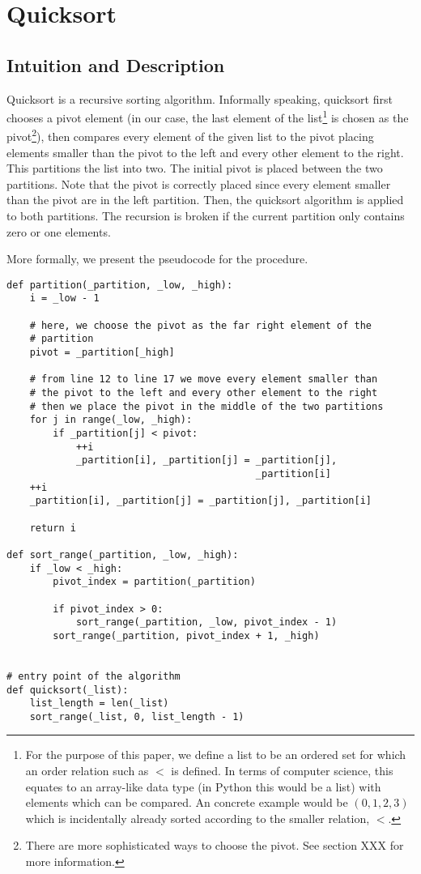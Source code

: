 \section{Quicksort}
\subsection{Intuition and Description}
Quicksort is a recursive sorting algorithm. Informally speaking, quicksort first chooses a pivot element (in our case, the last element of the list\footnote{For the purpose of this paper, we define a list to be an ordered set for which an order relation such as \(<\) is defined. In terms of computer science, this equates to an array-like data type (in Python this would be a list) with elements which can be compared. An concrete example would be \((0, 1, 2, 3)\) which is incidentally already sorted according to the smaller relation, \(<\).} is chosen as the pivot\footnote{There are more sophisticated ways to choose the pivot. See section XXX for more information.}), then compares every element of the given list to the pivot placing elements smaller than the pivot to the left and every other element to the right. This partitions the list into two. The initial pivot is placed between the two partitions. Note that the pivot is correctly placed since every element smaller than the pivot are in the left partition. Then, the quicksort algorithm is applied to both partitions. The recursion is broken if the current partition only contains zero or one elements.

More formally, we present the pseudocode for the procedure.

\begin{lstlisting}
def partition(_partition, _low, _high):
    i = _low - 1

    # here, we choose the pivot as the far right element of the
    # partition
    pivot = _partition[_high]

    # from line 12 to line 17 we move every element smaller than 
    # the pivot to the left and every other element to the right
    # then we place the pivot in the middle of the two partitions
    for j in range(_low, _high):
        if _partition[j] < pivot:
            ++i
            _partition[i], _partition[j] = _partition[j], 
                                           _partition[i]
    ++i
    _partition[i], _partition[j] = _partition[j], _partition[i]

    return i

def sort_range(_partition, _low, _high):
    if _low < _high:
        pivot_index = partition(_partition)

        if pivot_index > 0:
            sort_range(_partition, _low, pivot_index - 1)
        sort_range(_partition, pivot_index + 1, _high)


# entry point of the algorithm
def quicksort(_list):
    list_length = len(_list)
    sort_range(_list, 0, list_length - 1)

\end{lstlisting}

